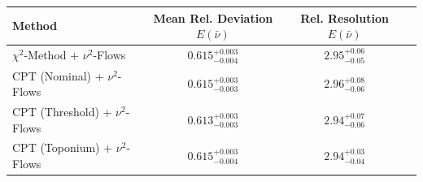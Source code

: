     \begin{tabular}{lccc}
        \toprule
        Method & Mean Rel. Deviation $E(\bar{\nu})$ & Rel. Resolution $E(\bar{\nu})$ \\
        \midrule
        $\chi^2$-Method + $\nu^2$-Flows & $0.615^{+0.003}_{-0.004}$ & $2.95^{+0.06}_{-0.05}$ \\
        CPT (Nominal) + $\nu^2$-Flows & $0.615^{+0.003}_{-0.003}$ & $2.96^{+0.08}_{-0.06}$ \\
        CPT (Threshold) + $\nu^2$-Flows & $0.613^{+0.003}_{-0.003}$ & $2.94^{+0.07}_{-0.06}$ \\
        CPT (Toponium) + $\nu^2$-Flows & $0.615^{+0.003}_{-0.004}$ & $2.94^{+0.03}_{-0.04}$ \\
        \bottomrule
    \end{tabular}